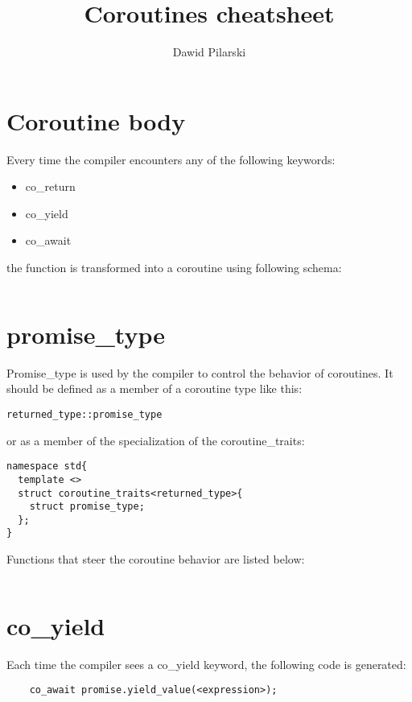 \documentclass[twoside,twocolumn, 10pt]{article}
\author{Dawid Pilarski}
\date{}
\title{Coroutines cheatsheet}
\begin{document}
\pagebreak[0]
\section{Coroutine body}

Every time the compiler encounters any of the following
keywords: 
\begin{itemize}
	\item co\_return
	\item co\_yield
	\item co\_await
\end{itemize}

the function is transformed into a coroutine using following schema:

\begin{listing}
\inputminted{c++}{code-examples/theory-custom-coroutine/coroutine-body.cpp}
\end{listing}

\pagebreak[0]
\section{promise\_type}

Promise\_type is used by the compiler to control the behavior of coroutines.
It should be defined as a member of a coroutine type like this:

\begin{verbatim}
returned_type::promise_type
\end{verbatim}

or as a member of the specialization of the coroutine\_traits:

\begin{verbatim}
namespace std{
  template <> 
  struct coroutine_traits<returned_type>{
    struct promise_type;
  };
}
\end{verbatim}

Functions that steer the coroutine behavior are listed below:

\inputminted{c++}{code-examples/theory-custom-coroutine/promise-type.hpp}

\pagebreak[0]
\section{co\_yield}
	Each time the compiler sees a co\_yield keyword, the following
	code is generated:

\begin{verbatim}
	co_await promise.yield_value(<expression>);
\end{verbatim}
\end{document}
